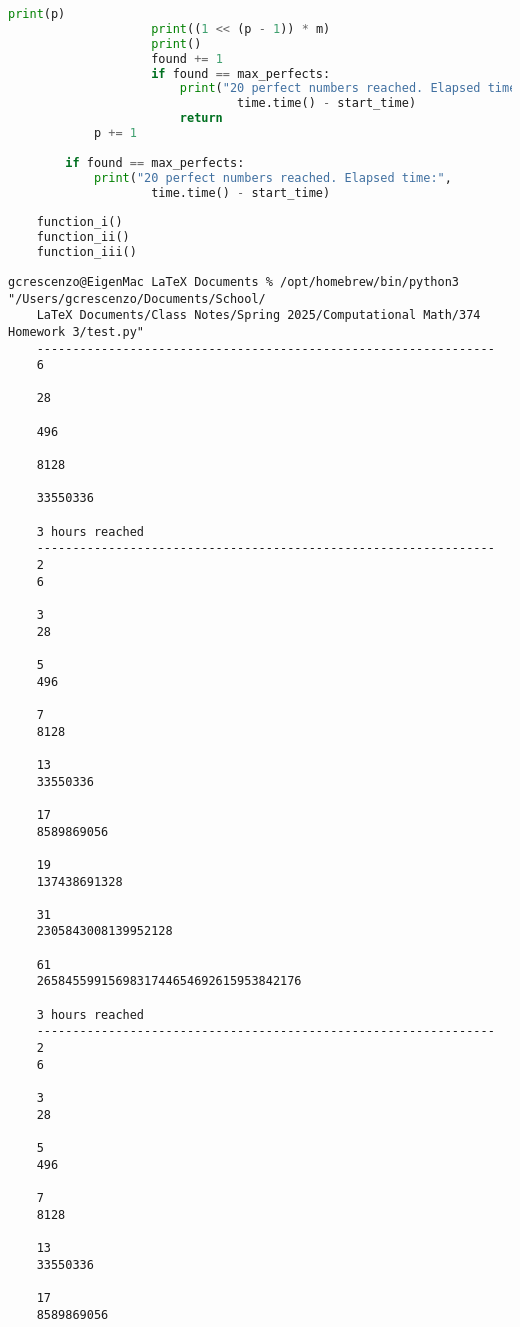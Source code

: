 \documentclass[11pt,twoside,openany]{memoir}
\begin{document}
\begin{lstlisting}[language=Python, basicstyle=\ttfamily\tiny,]
                    print(p)
                    print((1 << (p - 1)) * m)
                    print()
                    found += 1
                    if found == max_perfects:
                        print("20 perfect numbers reached. Elapsed time:",
                                time.time() - start_time)
                        return
            p += 1
    
        if found == max_perfects:
            print("20 perfect numbers reached. Elapsed time:",
                    time.time() - start_time)
    
    function_i()
    function_ii()
    function_iii()
\end{lstlisting}

\vspace{20pt}

\begin{tcolorbox}
\begin{Verbatim}[fontsize=\tiny]
    gcrescenzo@EigenMac LaTeX Documents % /opt/homebrew/bin/python3 "/Users/gcrescenzo/Documents/School/
    LaTeX Documents/Class Notes/Spring 2025/Computational Math/374 Homework 3/test.py"
    ----------------------------------------------------------------
    6
    
    28
    
    496
    
    8128
    
    33550336
    
    3 hours reached
    ----------------------------------------------------------------
    2
    6
    
    3
    28
    
    5
    496
    
    7
    8128
    
    13
    33550336
    
    17
    8589869056
    
    19
    137438691328
    
    31
    2305843008139952128
    
    61
    2658455991569831744654692615953842176
    
    3 hours reached
    ----------------------------------------------------------------
    2
    6
    
    3
    28
    
    5
    496
    
    7
    8128
    
    13
    33550336
    
    17
    8589869056
    

\end{Verbatim}
\end{tcolorbox}
\end{document}
